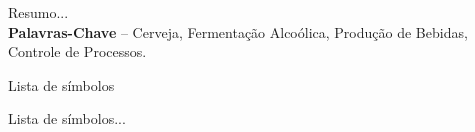 \documentclass[]{politex}
\begin{document}
\capa
\falsafolhaderosto
\folhaderosto














\begin{resumo}
Resumo...
%
\\[3\baselineskip]
%
\textbf{Palavras-Chave} -- Cerveja, Fermentação Alcoólica, Produção de Bebidas, Controle de Processos.
\end{resumo}




\listadefiguras
\listadetabelas

\begin{pretextualsection}{Lista de símbolos}

Lista de símbolos...

\end{pretextualsection}

\sumario



\end{document}
